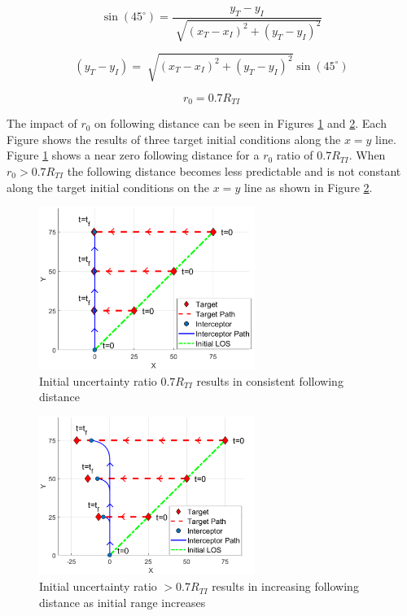 \documentclass[conference]{IEEEtran}
\providecommand{\DIFdelbegin}{} %
\providecommand{\DIFdelend}{} %
\newcommand{\DIFscaledelfig}{0.5}
\newlength{\DIFdelgraphicswidth} %
\newlength{\DIFdelgraphicsheight} %
\newcommand{\DIFdelincludegraphics}[2][]{%
\sbox{\DIFdelgraphicsbox}{\DIFOincludegraphics[#1]{#2}}%
\settoboxwidth{\DIFdelgraphicswidth}{\DIFdelgraphicsbox} %
\settoboxtotalheight{\DIFdelgraphicsheight}{\DIFdelgraphicsbox} %
\scalebox{\DIFscaledelfig}{%
\parbox[b]{\DIFdelgraphicswidth}{\usebox{\DIFdelgraphicsbox}\\[-\baselineskip] \rule{\DIFdelgraphicswidth}{0em}}\llap{\resizebox{\DIFdelgraphicswidth}{\DIFdelgraphicsheight}{%
\setlength{\unitlength}{\DIFdelgraphicswidth}%
\begin{picture}(1,1)%
\thicklines\linethickness{2pt} %
{\color[rgb]{1,0,0}\put(0,0){\framebox(1,1){}}}%
{\color[rgb]{1,0,0}\put(0,0){\line( 1,1){1}}}%
{\color[rgb]{1,0,0}\put(0,1){\line(1,-1){1}}}%
\end{picture}%
}\hspace*{3pt}}} %
} %
\DeclareRobustCommand{\DIFdelbegin}{\DIFOdelbegin \let\includegraphics\DIFdelincludegraphics} %
\DeclareRobustCommand{\DIFdelend}{\DIFOaddend \let\includegraphics\DIFOincludegraphics} %
\begin{document}
\DIFdelend \begin{equation} \label{minr}
\sin(45^\circ) = \frac{y_T - y_I}{\sqrt[]{(x_T - x_I)^2+(y_T - y_I)^2}}
\end{equation}



\begin{equation} \label{rtiforminr}
 (y_T - y_I) = \sqrt[]{(x_T - x_I)^2+(y_T - y_I)^2}\sin(45^\circ)
\end{equation}



\DIFdelbegin %

\DIFdelend \begin{equation} \label{initialr}
r_0 = 0.7R_{TI}
\end{equation}

The impact of $r_0$ on following distance can be seen in Figures \ref{fig:rti07} and \ref{fig:rti08}.
 Each Figure shows the results of three target initial conditions along the $x=y$ line. Figure \ref{fig:rti07} shows a near zero following distance for a $r_0$ ratio of $0.7R_{TI}$. When $r_0>0.7R_{TI}$ the following distance becomes less predictable and is not constant along the target initial conditions on the $x=y$ line as shown in Figure \ref{fig:rti08}.



\begin{figure}[H]
	\centering
	\includegraphics[width=7cm]{Rinit07new.png}
	\caption{Initial uncertainty ratio $0.7R_{TI}$ results in consistent following distance}
	\label{fig:rti07}
\end{figure}

\begin{figure}[H]
	\centering
	\includegraphics[width=7cm]{rinit08new.png}
	\caption{Initial uncertainty ratio $>0.7R_{TI}$ results in increasing following distance as initial range increases}
	\label{fig:rti08}
\end{figure}
\end{document}

